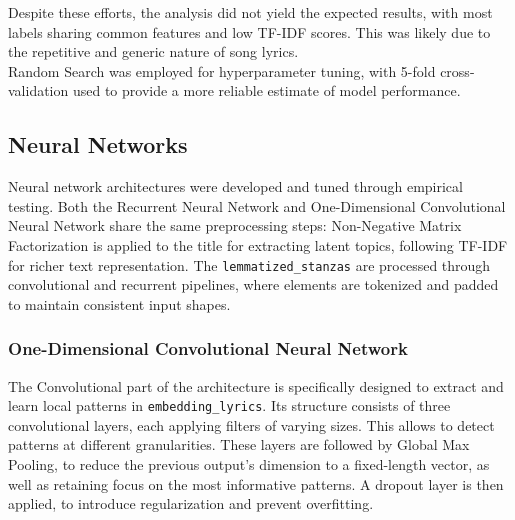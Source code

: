 Despite these efforts, the analysis did not yield the expected results, with most labels sharing common features and low TF-IDF scores.
This was likely due to the repetitive and generic nature of song lyrics.\\

Random Search was employed for hyperparameter tuning, with 5-fold cross-validation
used to provide a more reliable estimate of model performance.



\subsection*{Neural Networks}

Neural network architectures were developed and tuned through empirical
testing. Both the Recurrent
Neural Network and One-Dimensional Convolutional Neural Network share the same
preprocessing steps: Non-Negative Matrix Factorization is applied to the title
for extracting latent topics, following TF-IDF for richer text representation.
The \texttt{lemmatized\_stanzas} are processed through convolutional and
recurrent pipelines, where elements are tokenized and padded to maintain
consistent input shapes.

\subsubsection*{One-Dimensional Convolutional Neural Network}
The Convolutional part of the architecture is specifically designed to extract and learn
local patterns in \texttt{embedding\_lyrics}.
Its structure consists of three convolutional layers, each applying filters of
varying sizes. This allows to detect patterns at different granularities.
These layers are followed by Global Max Pooling, to reduce the previous output's
dimension to a fixed-length vector, as well as retaining focus on the most
informative patterns.
A dropout layer is then applied, to introduce regularization and prevent
overfitting.

